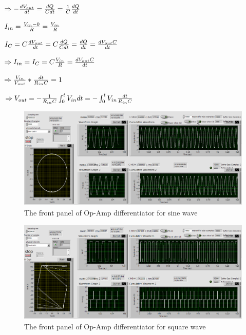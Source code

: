 \documentclass[11pt]{article}
\begin{document}
$\Rightarrow -{dV_{out} \over dt}={dQ \over Cdt}={1 \over C}{dQ \over dt}$

$I_{in}={{V_{in}-0}\over R}={V_{in}\over R}$

$I_{C}=C{dV_{out} \over dt}=C{dQ \over Cdt}={dQ\over dt}={dV_{out}C \over dt}$

$\Rightarrow I_{in}=I_{C}=C{V_{in} \over R}={dV_{out}C \over dt}$

$\Rightarrow {V_{in}\over V_{out}}*{dt\over R_{in}C}=1$

$\Rightarrow V_{out}=-{1\over R_{in}C}\int_{0}^{t}V_{in}dt=-\int_{0}^{t}V_{in}{dt\over R_{in}C}$


\begin{figure}[H]
 \begin{center}
  \includegraphics[width=\linewidth/1]{act6diff_sin}
  \caption{The front panel of Op-Amp differentiator for sine wave}
  \label{fig:act6diff_sin}
 \end{center}
\end{figure}

\begin{figure}[H]
 \begin{center}
  \includegraphics[width=\linewidth/1]{act6diff_square}
  \caption{The front panel of Op-Amp differentiator for square wave}
  \label{fig:act6diff_square}
 \end{center}
\end{figure}
\end{document}
